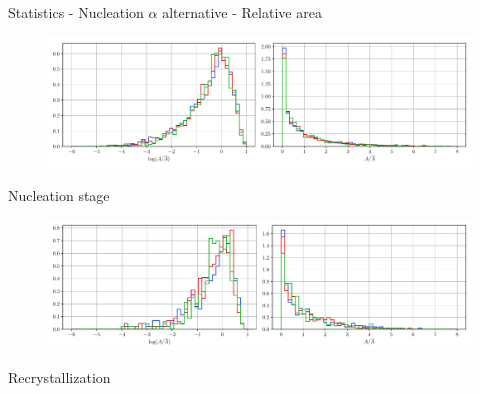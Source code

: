 \documentclass[usenames,dvipsnames]{beamer}
\begin{document}
\begin{frame}{Statistics - Nucleation $\alpha$ alternative - Relative area}
\small
\centering
    \vspace{-0.5em}
    \begin{figure}
        \centering
        \includegraphics[scale=0.35]{figures/stored_energy/SE/areas/000110_nuclalternative_set.pdf}
    \end{figure}
    \vspace{-1em}
    Nucleation stage
    \begin{figure}
        \centering
        \includegraphics[scale=0.35]{figures/stored_energy/SE/areas/000240_nuclalternative_set.pdf}
    \end{figure}
    \vspace{-1em}
    Recrystallization
\end{frame}
\end{document}
